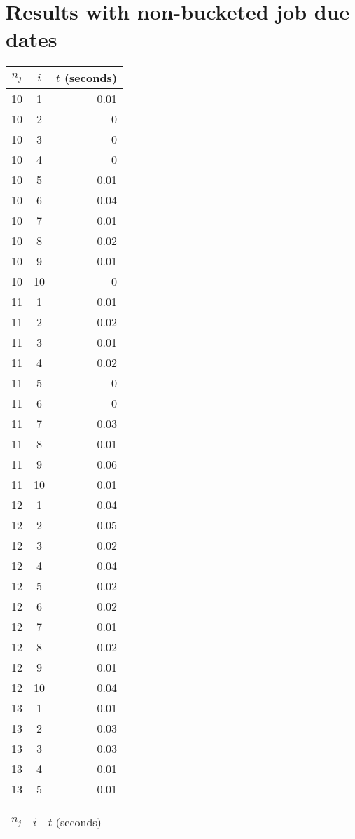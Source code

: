 \documentclass[13pt, letterpaper, oneside]{book}
\begin{document}
\section{Results with non-bucketed job due dates}
\begin{multicols}{4}
\begin{tabular}{c c r}
\toprule
$n_j$ & $i$ & $t$ (seconds) \\
\midrule 
10 & 1 & 0.01 \\
10 & 2 & 0 \\
10 & 3 & 0 \\
10 & 4 & 0 \\
10 & 5 & 0.01 \\
10 & 6 & 0.04 \\
10 & 7 & 0.01 \\
10 & 8 & 0.02 \\
10 & 9 & 0.01 \\
10 & 10 & 0 \\
11 & 1 & 0.01 \\
11 & 2 & 0.02 \\
11 & 3 & 0.01 \\
11 & 4 & 0.02 \\
11 & 5 & 0 \\
11 & 6 & 0 \\
11 & 7 & 0.03 \\
11 & 8 & 0.01 \\
11 & 9 & 0.06 \\
11 & 10 & 0.01 \\
12 & 1 & 0.04 \\
12 & 2 & 0.05 \\
12 & 3 & 0.02 \\
12 & 4 & 0.04 \\
12 & 5 & 0.02 \\
12 & 6 & 0.02 \\
12 & 7 & 0.01 \\
12 & 8 & 0.02 \\
12 & 9 & 0.01 \\
12 & 10 & 0.04 \\
13 & 1 & 0.01 \\
13 & 2 & 0.03 \\
13 & 3 & 0.03 \\
13 & 4 & 0.01 \\
13 & 5 & 0.01 \\
\bottomrule
\end{tabular}
\vfill
\columnbreak
\begin{tabular}{c c r}
\toprule
$n_j$ & $i$ & $t$ (seconds) \\

\end{tabular}
\end{multicols}
\end{document}
